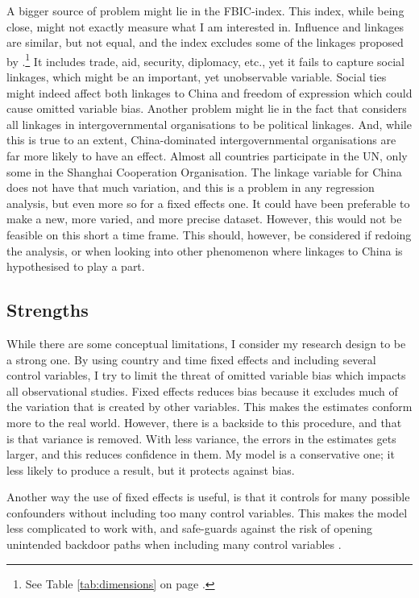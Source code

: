 A bigger source of problem might lie in the FBIC-index. This index, while being close, might not exactly measure what I am interested in. Influence and linkages are similar, but not equal, and the index excludes some of the linkages proposed by \citet{levitsky_competitive_2010}.\footnote{See Table \ref{tab:dimensions} on page \pageref{tab:dimensions}.} It includes trade, aid, security, diplomacy, etc., yet it fails to capture social linkages, which might be an important, yet unobservable variable. Social ties might indeed affect both linkages to China and freedom of expression which could cause omitted variable bias. Another problem might lie in the fact that \citep{moyer_china-us_2021} considers all linkages in intergovernmental organisations to be political linkages. And, while this is true to an extent, China-dominated intergovernmental organisations are far more likely to have an effect. Almost all countries participate in the UN, only some in the Shanghai Cooperation Organisation. The linkage variable for China does not have that much variation, and this is a problem in any regression analysis, but even more so for a fixed effects one. It could have been preferable to make a new, more varied, and more precise dataset. However, this would not be feasible on this short a time frame. This should, however, be considered if redoing the analysis, or when looking into other phenomenon where linkages to China is hypothesised to play a part.

\subsection{Strengths}
While there are some conceptual limitations, I consider my research design to be a strong one. By using country and time fixed effects and including several control variables, I try to limit the threat of omitted variable bias which impacts all observational studies. Fixed effects reduces bias because it excludes much of the variation that is created by other variables. This makes the estimates conform more to the real world. However, there is a backside to this procedure, and that is that variance is removed. With less variance, the errors in the estimates gets larger, and this reduces confidence in them. My model is a conservative one; it less likely to produce a result, but it protects against bias. 

Another way the use of fixed effects is useful, is that it controls for many possible confounders without including too many control variables. This makes the model less complicated to work with, and safe-guards against the risk of opening unintended backdoor paths when including many control variables \citep[Chapter 3]{cunningham_causal_2021}.

